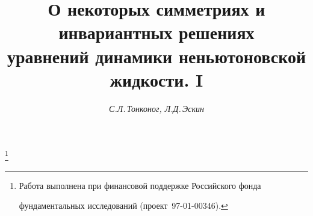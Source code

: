 









\newcommand{\arctg}{\operatorname{arctg}}


\newcommand{\tts}[1]{}










\setcounter{page}{55}












\author{\it С.Л.\,Тонконог, Л.Д.\,Эскин}




\title{О некоторых симметриях и инвариантных решениях\\


уравнений динамики неньютоновской жидкости. I}





\thanks{Работа выполнена при финансовой поддержке Российского фонда


фундаментальных исследований (проект \No\,97-01-00346).}


\date{}







\pagestyle{plain} %








